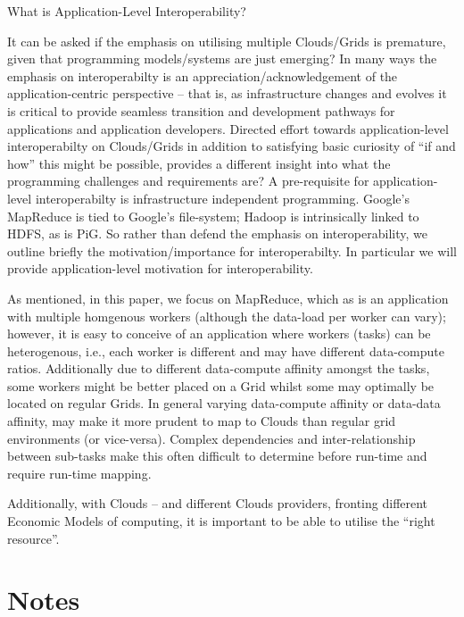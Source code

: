 \documentclass[conference,final]{IEEEtran}
\begin{document}
What is Application-Level Interoperability?

It can be asked if the emphasis on utilising multiple Clouds/Grids is
premature, given that programming models/systems are just emerging? In
many ways the emphasis on interoperabilty is an
appreciation/acknowledgement of the application-centric perspective --
that is, as infrastructure changes and evolves it is critical to
provide seamless transition and development pathways for applications
and application developers. Directed effort towards application-level
interoperabilty on Clouds/Grids in addition to satisfying basic
curiosity of ``if and how'' this might be possible, provides a
different insight into what the programming challenges and
requirements are?  A pre-requisite for application-level
interoperabilty is infrastructure independent programming. Google's
MapReduce is tied to Google's file-system; Hadoop is intrinsically
linked to HDFS, as is PiG.  So rather than defend the emphasis on
interoperability, we outline briefly the motivation/importance for
interoperabilty. In particular we will provide application-level
motivation for interoperability.

As mentioned, in this paper, we focus on MapReduce, which as is an
application with multiple homgenous workers (although the data-load
per worker can vary); however, it is easy to conceive of an
application where workers (tasks) can be heterogenous, i.e., each
worker is different and may have different data-compute ratios.
Additionally due to different data-compute affinity amongst the tasks,
some workers might be better placed on a Grid whilst some may
optimally be located on regular Grids.  In general varying
data-compute affinity or data-data affinity, may make it more prudent
to map to Clouds than regular grid environments (or vice-versa).
Complex dependencies and inter-relationship between sub-tasks make
this often difficult to determine before run-time and require run-time
mapping.

Additionally, with Clouds -- and different Clouds providers, fronting
different Economic Models of computing, it is important to be able to
utilise the ``right resource''.


\section*{Notes}
\end{document}
